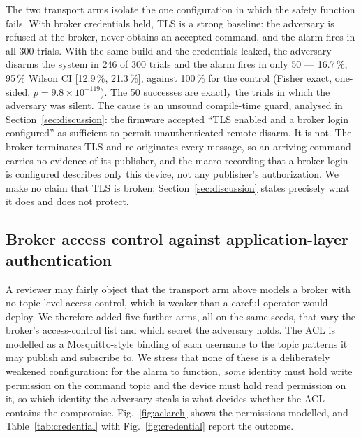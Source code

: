 The two transport arms isolate the one configuration in which the safety function fails. With
broker credentials held, TLS is a strong baseline: the adversary is refused at the broker, never
obtains an accepted command, and the alarm fires in all 300 trials. With the same build and the
credentials leaked, the adversary disarms the system in 246 of 300 trials and the alarm fires in
only 50 --- 16.7\,\%, 95\,\% Wilson CI [12.9\,\%, 21.3\,\%], against 100\,\% for the control
(Fisher exact, one-sided, $p = 9.8\times10^{-119}$). The 50 successes are exactly the trials in
which the adversary was silent. The cause is an unsound compile-time guard, analysed in
Section~\ref{sec:discussion}: the firmware accepted ``TLS enabled and a broker login configured'' as
sufficient to permit unauthenticated remote disarm. It is not. The broker terminates TLS and
re-originates every message, so an arriving command carries no evidence of its publisher, and the
macro recording that a broker login is configured describes only this device, not any publisher's
authorization. We make no claim that TLS is broken; Section~\ref{sec:discussion} states precisely what
it does and does not protect.

\subsection{Broker access control against application-layer authentication}
\label{sec:acl}

A reviewer may fairly object that the transport arm above models a broker with no topic-level
access control, which is weaker than a careful operator would deploy. We therefore added five
further arms, all on the same seeds, that vary the broker's access-control list and which
secret the adversary holds. The ACL is modelled as a Mosquitto-style binding of each username
to the topic patterns it may publish and subscribe to. We stress that none of these is a
deliberately weakened configuration: for the alarm to function, \emph{some} identity must hold
write permission on the command topic and the device must hold read permission on it, so which
identity the adversary steals is what decides whether the ACL contains the compromise.
Fig.~\ref{fig:aclarch} shows the permissions modelled, and Table~\ref{tab:credential} with
Fig.~\ref{fig:credential} report the outcome.


